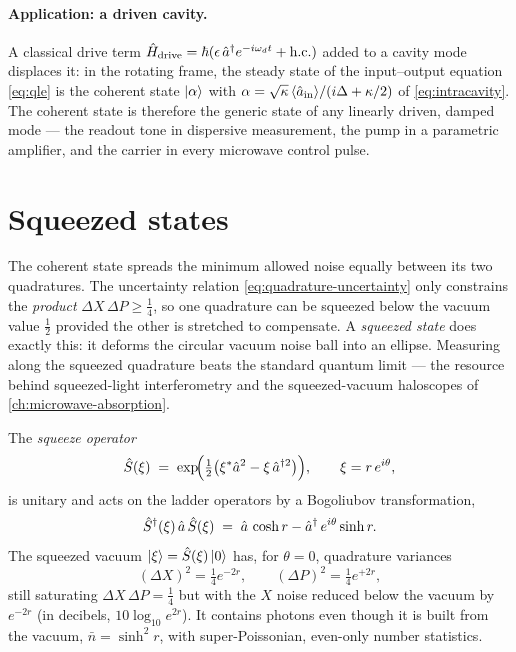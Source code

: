 \paragraph{Application: a driven cavity.}
A classical drive term $\hat{H}_{\rm drive}=\hbar(\epsilon\,\hat a^\dagger e^{-i\omega_d t}+\text{h.c.})$
added to a cavity mode displaces it: in the rotating frame, the
steady state of the input--output equation \cref{eq:qle} is the
coherent state $\ket{\alpha}$ with $\alpha=\sqrt\kappa\,\langle\hat a_{\rm in}\rangle/(i\Delta+\kappa/2)$
of \cref{eq:intracavity}. The coherent state is therefore the
generic state of any linearly driven, damped mode --- the readout
tone in dispersive measurement, the pump in a parametric amplifier,
and the carrier in every microwave control pulse.

\section{Squeezed states}
\label{sec:squeezed-states}

\begin{phenomenon}
The coherent state spreads the minimum allowed noise equally
between its two quadratures. The uncertainty relation
\cref{eq:quadrature-uncertainty} only constrains the
\emph{product} $\Delta X\,\Delta P\geq\tfrac14$, so one quadrature
can be squeezed below the vacuum value $\tfrac12$ provided the
other is stretched to compensate. A \emph{squeezed state} does
exactly this: it deforms the circular vacuum noise ball into an
ellipse. Measuring along the squeezed quadrature beats the standard
quantum limit --- the resource behind squeezed-light interferometry
and the squeezed-vacuum haloscopes of \cref{ch:microwave-absorption}.
\end{phenomenon}

\begin{statement}
\label{stmt:squeezing}
The \emph{squeeze operator}
\begin{equation}
\label{eq:squeeze}
\hat{S}(\xi) \;=\; \exp\!\Bigl(\tfrac12\bigl(\xi^*\hat a^2 - \xi\,\hat a^{\dagger2}\bigr)\Bigr),
\qquad \xi=r\,e^{i\theta},
\end{equation}
is unitary and acts on the ladder operators by a Bogoliubov
transformation,
\begin{equation}
\label{eq:squeeze-bogoliubov}
\hat{S}^\dagger(\xi)\,\hat a\,\hat{S}(\xi)
\;=\; \hat a\,\cosh r - \hat a^\dagger\,e^{i\theta}\sinh r.
\end{equation}
The squeezed vacuum $\ket\xi=\hat{S}(\xi)\ket0$ has, for $\theta=0$,
quadrature variances
\begin{equation}
\label{eq:squeeze-variances}
(\Delta X)^2 = \tfrac14 e^{-2r},
\qquad
(\Delta P)^2 = \tfrac14 e^{+2r},
\end{equation}
still saturating $\Delta X\,\Delta P=\tfrac14$ but with the $X$
noise reduced below the vacuum by $e^{-2r}$ (in decibels,
$10\log_{10}e^{2r}$). It contains photons even though it is built
from the vacuum, $\bar n=\sinh^2 r$, with super-Poissonian,
even-only number statistics.
\end{statement}

